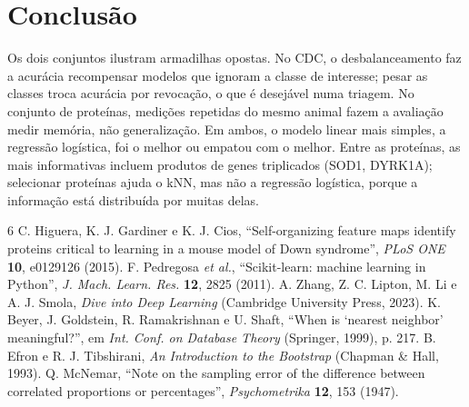 \documentclass[aps,pre,twocolumn,10pt,nofootinbib]{revtex4-2}
\begin{document}
\section{Conclusão}
Os dois conjuntos ilustram armadilhas opostas. No CDC, o desbalanceamento
faz a acurácia recompensar modelos que ignoram a classe de interesse;
pesar as classes troca acurácia por revocação, o que é desejável numa
triagem. No conjunto de proteínas, medições repetidas do mesmo animal fazem
a avaliação medir memória, não generalização. Em ambos, o modelo linear
mais simples, a regressão logística, foi o melhor ou empatou com o melhor.
Entre as proteínas, as mais informativas incluem produtos de genes
triplicados (SOD1, DYRK1A); selecionar proteínas ajuda o kNN, mas não a
regressão logística, porque a informação está distribuída por muitas
delas.

\begin{thebibliography}{6}
 C. Higuera, K. J. Gardiner e K. J. Cios,
``Self-organizing feature maps identify proteins critical to learning in a
mouse model of Down syndrome'', \textit{PLoS ONE} \textbf{10}, e0129126
(2015).
 F. Pedregosa \textit{et al.}, ``Scikit-learn: machine
learning in Python'', \textit{J. Mach. Learn. Res.} \textbf{12}, 2825
(2011).
 A. Zhang, Z. C. Lipton, M. Li e A. J. Smola,
\textit{Dive into Deep Learning} (Cambridge University Press, 2023).
 K. Beyer, J. Goldstein, R. Ramakrishnan e U. Shaft,
``When is `nearest neighbor' meaningful?'', em \textit{Int. Conf. on
Database Theory} (Springer, 1999), p. 217.
 B. Efron e R. J. Tibshirani, \textit{An Introduction
to the Bootstrap} (Chapman \& Hall, 1993).
 Q. McNemar, ``Note on the sampling error of the
difference between correlated proportions or percentages'',
\textit{Psychometrika} \textbf{12}, 153 (1947).
\end{thebibliography}
\end{document}
